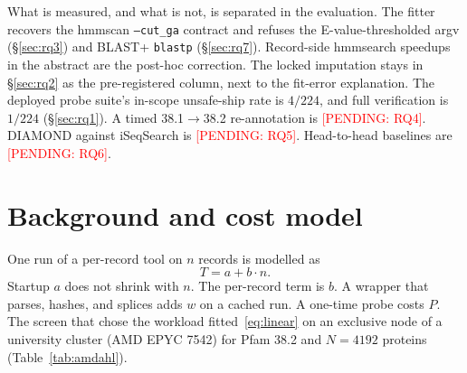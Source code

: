 \documentclass[letterpaper,twocolumn,10pt]{article}
\newcommand{\pending}[1]{\textcolor{red}{[PENDING: #1]}}
\begin{document}
What is measured, and what is not, is separated in the evaluation.
The fitter recovers the hmmscan \texttt{--cut\_ga} contract and refuses the E-value-thresholded argv (\S\ref{sec:rq3}) and BLAST+ \texttt{blastp} (\S\ref{sec:rq7}).
Record-side hmmsearch speedups in the abstract are the post-hoc correction.
The locked imputation stays in \S\ref{sec:rq2} as the pre-registered column, next to the fit-error explanation.
The deployed probe suite's in-scope unsafe-ship rate is
$4/224$,
and full verification is
$1/224$
(\S\ref{sec:rq1}).
A timed 38.1$\to$38.2 re-annotation is
\pending{RQ4}.
DIAMOND against iSeqSearch is
\pending{RQ5}.
Head-to-head baselines are
\pending{RQ6}.

\section{Background and cost model}
\label{sec:model}

One run of a per-record tool on $n$ records is modelled as
\begin{equation}
T = a + b \cdot n .
\label{eq:linear}
\end{equation}
Startup $a$ does not shrink with $n$.
The per-record term is $b$.
A wrapper that parses, hashes, and splices adds $w$ on a cached run.
A one-time probe costs $P$.
The screen that chose the workload fitted~\eqref{eq:linear} on an exclusive node of a university cluster (AMD EPYC 7542) for Pfam 38.2 and
$N = 4192$
proteins (Table~\ref{tab:amdahl}).
\end{document}
